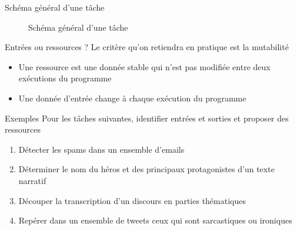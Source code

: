 \documentclass[hyperref={unicode}, xcolor={svgnames}, french]{beamer}
\begin{document}
\begin{frame}[fragile]{Schéma général d'une tâche}
    \begin{figure}
        \tikzset{external/export=true}
        \caption{Schéma général d'une tâche}
    \end{figure}
\end{frame}

\begin{frame}{Entrées ou ressources ?}
    Le critère qu'on retiendra en pratique est la mutabilité
    \begin{itemize}
        \item Une ressource est une donnée stable qui n'est pas modifiée entre deux exécutions du programme
        \item Une donnée d'entrée change à chaque exécution du programme
    \end{itemize}
\end{frame}

\begin{frame}{Exemples}
    Pour les tâches suivantes, identifier entrées et sorties et proposer des ressources
    \begin{enumerate}
        \item Détecter les spams dans un ensemble d'emails
        \item Déterminer le nom du héros et des principaux protagonistes d'un texte narratif
        \item Découper la transcription d'un discours en parties thématiques
        \item Repérer dans un ensemble de tweets ceux qui sont sarcastiques ou ironiques
    \end{enumerate}
\end{frame}
\end{document}

